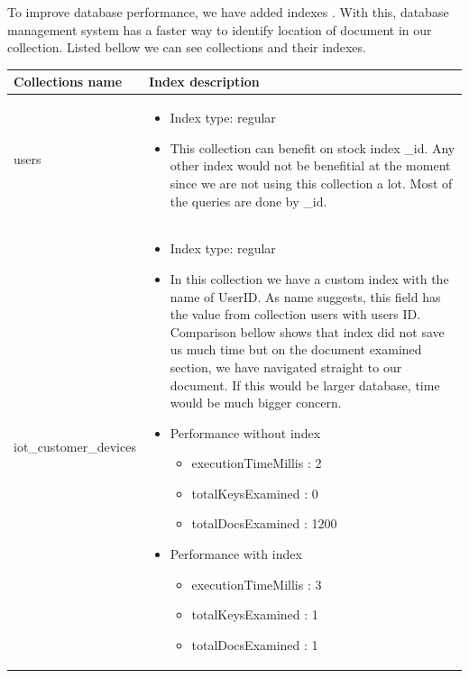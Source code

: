 To improve database performance, we have added indexes \parencite{web:MongoIndexes}. With this, database management system has a faster way to identify location of document in our collection. Listed bellow we can see collections and their indexes.
\begin{center}
\begin{longtable}{ |m{4cm}|m{9cm}| } 
 \hline
 Collections name & Index description \\ 
 \hline
  users &   
  \begin{itemize}
    \item Index type: regular
    \item This collection can benefit on stock index {\_}id. Any other index would not be benefitial at the moment since we are not using this collection a lot. Most of the queries are done by {\_}id.
  \end{itemize} \\
  
  \hline
  iot{\_}customer{\_}devices &  
  \begin{itemize}
    \item Index type: regular
    \item In this collection we have a custom index with the name of UserID. As name suggests, this field has the value from collection users with users ID. Comparison bellow shows that index did not save us much time but on the document examined section, we have navigated straight to our document. If this would be larger database, time would be much bigger concern.
    \item Performance without index
    \begin{itemize}
        \item executionTimeMillis : 2
        \item totalKeysExamined : 0
        \item totalDocsExamined : 1200
    \end{itemize}
    \item Performance with index
    \begin{itemize}
        \item executionTimeMillis : 3
        \item totalKeysExamined : 1
        \item totalDocsExamined : 1
    \end{itemize}
  \end{itemize} \\
  

\end{longtable}
\end{center}
